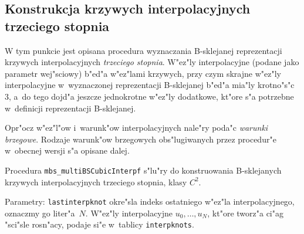 \subsection{Konstrukcja krzywych interpolacyjnych trzeciego stopnia}

W tym punkcie jest opisana procedura wyznaczania B-sklejanej reprezentacji
krzywych interpolacyjnych \emph{trzeciego stopnia}. W"ez"ly interpolacyjne
(podane jako parametr wej"sciowy) b"ed"a w"ez"lami krzywych, przy czym
skrajne w"ez"ly interpolacyjne w~wyznaczonej reprezentacji B-sklejanej
b"ed"a mia"ly krotno"s"c $3$, a~do tego dojd"a jeszcze jednokrotne w"ez"ly
dodatkowe, kt"ore s"a potrzebne w~definicji reprezentacji B-sklejanej.

Opr"ocz w"ez"l"ow i~warunk"ow interpolacyjnych nale"ry poda"c \emph{warunki
brzegowe}. Rodzaje warunk"ow brzegowych obs"lugiwanych przez procedur"e
w~obecnej wersji s"a opisane dalej.

\vspace{\bigskipamount}
\begin{sloppypar}
Procedura \texttt{mbs\_multiBSCubicInterpf} s"lu"ry do konstruowania
B-sklejanych krzywych interpolacyjnych trzeciego stopnia, klasy $C^2$.
\end{sloppypar}
\begin{sloppypar}
Parametry: \texttt{lastinterpknot} okre"sla indeks ostatniego w"ez"la
interpolacyjnego, oznacz\-my go liter"a~$N$. W"ez"ly interpolacyjne
$u_0,\ldots,u_N$, kt"ore tworz"a ci"ag "sci"sle rosn"acy, podaje si"e
w~tablicy \texttt{interpknots}.
\end{sloppypar}

